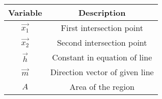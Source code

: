 \begin{tabular}[12pt]{ |c|c|}
    \hline
    \textbf{Variable} & \textbf{Description}\\ 
    \hline
    $\vec{x_1}$ & First intersection point\\
    \hline
    $\vec{x_2}$ & Second intersection point\\
    \hline
    $\vec{h}$ & Constant in equation of line\\
    \hline
    $\vec{m}$ & Direction vector of given line\\
    \hline
    $A$ & Area of the region\\
    \hline
    \end{tabular}
